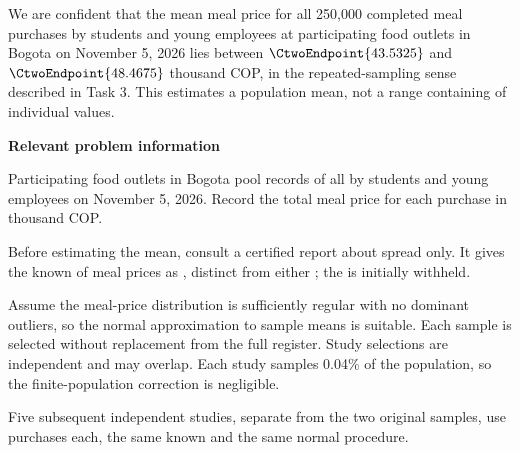 We are  confident that the mean meal price for all 250,000 completed meal purchases by students and young employees at participating food outlets in Bogota on November 5, 2026 lies between $\CtwoEndpoint{43.5325}$ and $\CtwoEndpoint{48.4675}$ thousand COP, in the repeated-sampling sense described in Task 3. This estimates a population mean, not a range containing  of individual values.

\secInicio[][sec:p3]

\clearpage



\textbf{Relevant problem information}

\begin{probleminfoexcerpt}
Participating food outlets in Bogota pool records of all     by students and young employees on November 5, 2026. Record the total meal price for each purchase in thousand COP.
\end{probleminfoexcerpt}

\begin{probleminfoexcerpt}
Before estimating the mean, consult a certified report about spread only. It gives the known    of meal prices as   , distinct from either   ; the   is initially withheld.
\end{probleminfoexcerpt}

\begin{probleminfoexcerpt}
Assume the meal-price distribution is sufficiently regular with no dominant outliers, so the normal approximation to sample means is suitable. Each sample is selected without replacement from the full register. Study selections are independent and may overlap. Each study samples 0.04\% of the population, so the finite-population correction is negligible.
\end{probleminfoexcerpt}

\begin{probleminfoexcerpt}
Five subsequent independent studies, separate from the two original samples, use  purchases each, the same known    and the same  normal procedure.
\end{probleminfoexcerpt}

